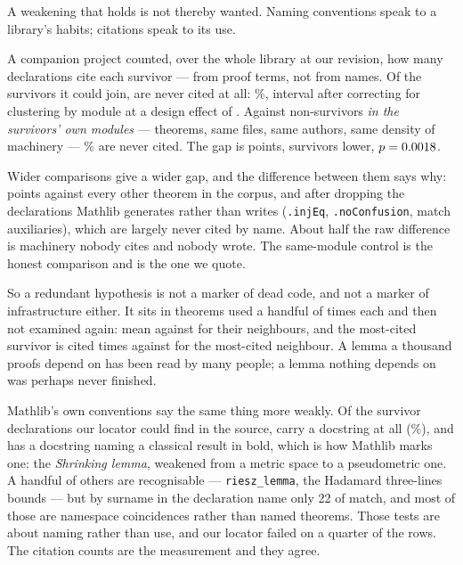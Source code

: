 \documentclass[11pt]{article}
\begin{document}
A weakening that holds is not thereby wanted. Naming conventions speak to a
library's habits; citations speak to its use.

A companion project \cite{companion} counted, over the whole library at our
revision, how many declarations cite each survivor --- from proof terms, not from names. Of the
\citedN{} survivors it could join, \citedNever{} are never cited at all:
\citedNeverPercent{}\%, interval \citedNeverCI{} after correcting for clustering
by module at a design effect of \citedDeff{}. Against non-survivors \emph{in the
survivors' own modules} --- \citedControlN{} theorems, same files, same authors,
same density of machinery --- \citedControlPercent{}\% are never cited. The gap
is \citedGap{} points, survivors lower, $p = 0.0018{}$.

Wider comparisons give a wider gap, and the difference between them says why:
\citedGapAll{} points against every other theorem in the corpus, and
\citedGapClean{} after dropping the \citedGenerated{} declarations Mathlib
generates rather than writes (\texttt{.injEq}, \texttt{.noConfusion}, match
auxiliaries), which are largely never cited by name. About half the raw
difference is machinery nobody cites and nobody wrote. The same-module control
is the honest comparison and is the one we quote.

So a redundant hypothesis is not a marker of dead code, and not a marker of
infrastructure either. It sits in theorems used a handful of times each and then
not examined again: mean \citedMean{} against \citedControlMean{} for their
neighbours, and the most-cited survivor is cited \citedMax{} times against
\citedControlMax{} for the most-cited neighbour. A lemma a thousand proofs
depend on has been read by many people; a lemma nothing depends on was perhaps
never finished.

Mathlib's own conventions say the same thing more weakly. Of the
\namedLocated{} survivor declarations our locator could find in the source,
\namedDocumented{} carry a docstring at all (\namedDocumentedPercent{}\%), and
\namedClassical{} has a docstring naming a classical result in bold, which is
how Mathlib marks one: the \emph{Shrinking lemma}, weakened from a metric space
to a pseudometric one. A handful of others are recognisable ---
\texttt{riesz\_lemma}, the Hadamard three-lines bounds --- but by surname in the
declaration name only 22 of \allSurvivors{} match, and most of those are
namespace coincidences rather than named theorems. Those tests are about naming
rather than use, and our locator failed on a quarter of the rows. The citation
counts are the measurement and they agree.
\end{document}
